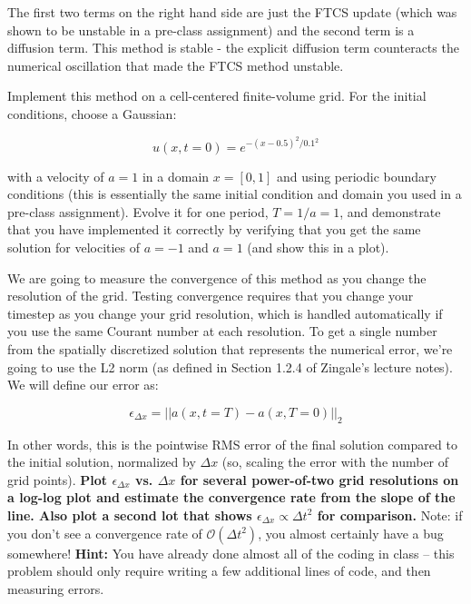 \documentclass[10pt]{article}
\begin{document}
\vspace{1mm}

The first two terms on the right hand side are just the FTCS update
(which was shown to be unstable in a pre-class assignment) and the second term is a diffusion
term.  This method is stable - the explicit diffusion term counteracts
the numerical oscillation that made the FTCS method unstable.  

Implement this method on a cell-centered finite-volume grid.  For the
initial conditions, choose a Gaussian:

\begin{equation}
u(x,t=0) = e^{-(x-0.5)^2/0.1^2}
\end{equation}

with a velocity of $a=1$ in a domain $x=[0,1]$ and using periodic
boundary conditions (this is essentially the same initial condition
and domain
you used in a pre-class assignment).  Evolve it for one period, $T=1/a=1$, and
demonstrate that you have implemented it correctly by verifying that
you get the same solution for velocities of $a=-1$ and $a=1$ (and show this in a plot).

We are going to measure the convergence of this method as you change
the resolution of the grid.  Testing
convergence requires that you change your timestep as you change your
grid resolution, which is handled automatically if you use the same
Courant number at each resolution.  To get a single  number from
the spatially discretized solution that represents the numerical error, we're going to use
the L2 norm (as defined in Section 1.2.4 of Zingale's lecture notes).
We will define our error as:

\begin{equation}
\epsilon_{\Delta x} = || a(x,t=T) - a(x,T=0) ||_2
\end{equation}

In other words, this is the pointwise RMS error of the final solution
compared to the initial solution, normalized by $\Delta x$ (so,
scaling the error with the number of grid points).  \textbf{Plot
$\epsilon_{\Delta x}$ vs. $\Delta x$ for several power-of-two grid resolutions on a
log-log plot and estimate the convergence rate from the slope of the
line.  Also plot a second lot that shows $\epsilon_{\Delta x} \propto
\Delta t^2$ for comparison.}  Note: if you don't see a convergence rate of
$\mathcal{O}(\Delta t^2)$, you almost certainly have a bug somewhere!
\textbf{Hint:} You have already done almost all of the coding in class
-- this problem should only require writing a few additional lines of
code, and then measuring errors.
\end{document}
